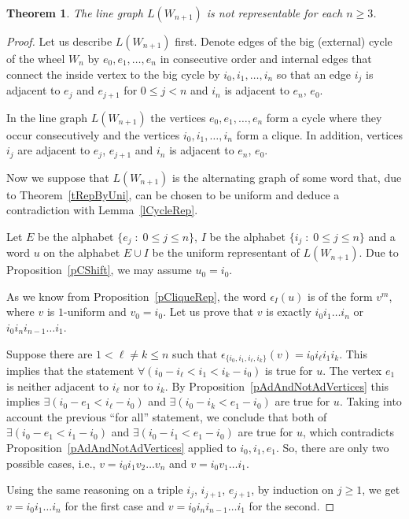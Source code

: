 \documentclass[12pt]{article}
\newtheorem{theorem}{Theorem}
\begin{document}
\begin{theorem}\label{wheelNonRep} The line graph $L(W_{n+1})$ is not representable for each $n \geqslant 3$.
\end{theorem}
\begin{proof} Let us describe $L(W_{n+1})$ first. Denote edges of the big (external) cycle of the wheel $W_n$ by $e_{0},e_1,\ldots,e_n$ in consecutive order and internal edges that connect the inside vertex to the big cycle  by $i_0,i_1,\ldots, i_n$ so that an edge $i_{j}$ is adjacent to $e_j$ and $e_{j+1}$ for $0\leqslant j <n$ and $i_n$ is adjacent to $e_n$, $e_0$.

In the line graph $L(W_{n+1})$ the vertices $e_{0},e_1,\ldots,e_n$ form a cycle where they occur consecutively and the vertices $i_0,i_1,\ldots, i_n$ form a clique. In addition, vertices $i_{j}$ are adjacent to $e_j$, $e_{j+1}$ and $i_n$ is adjacent to $e_n$, $e_0$.

Now we suppose that $L(W_{n+1})$ is the alternating graph of some word that, due to Theorem~\ref{tRepByUni}, can be chosen to be uniform and deduce a contradiction with Lemma~\ref{lCycleRep}.

Let $E$ be the alphabet $\{e_j \;:\; 0\leqslant j \leqslant n\}$, $I$ be the alphabet $\{i_j \;:\; 0\leqslant j \leqslant n\}$ and a word $u$ on the alphabet $E\cup I$ be the uniform representant of $L(W_{n+1})$. Due to Proposition~\ref{pCShift}, we may assume $u_0=i_0$.

As we know from Proposition~\ref{pCliqueRep}, the word $\epsilon_I(u)$ is of the form $v^m$, where $v$ is $1$-uniform and $v_0=i_0$. Let us prove that $v$ is exactly $i_0i_1\ldots i_n$ or $i_0i_ni_{n-1}\ldots i_1$.

Suppose there are $1< \ell \not=k\leqslant n$ such that $\epsilon_{\{i_0,i_1,i_\ell,i_k\}}(v)=i_0 i_\ell i_1 i_k$. This implies that the statement $\forall (i_0-i_\ell<i_1<i_k-i_0)$ is true for $u$. The vertex $e_1$ is neither adjacent to $i_\ell$ nor to $i_k$. By Proposition~\ref{pAdAndNotAdVertices} this implies $\exists (i_0-e_1<i_\ell-i_0)$ and $\exists (i_0-i_k<e_1-i_0)$ are true for $u$. Taking into account the previous ``for all'' statement, we conclude that both of $\exists (i_0-e_1<i_1-i_0)$ and $\exists (i_0-i_1<e_1-i_0)$ are true for $u$, which contradicts Proposition~\ref{pAdAndNotAdVertices} applied to $i_0,i_1,e_1$. So, there are only two possible cases, i.e., $v=i_0i_1v_2\ldots v_n$ and $v=i_0v_1\ldots i_1$.

Using the same reasoning on a triple $i_j$, $i_{j+1}$, $e_{j+1}$, by induction on $j\geqslant 1$, we get $v=i_0i_1\ldots i_n$ for the first case and $v=i_0i_ni_{n-1}\ldots i_1$ for the second.


\end{proof}
\end{document}
